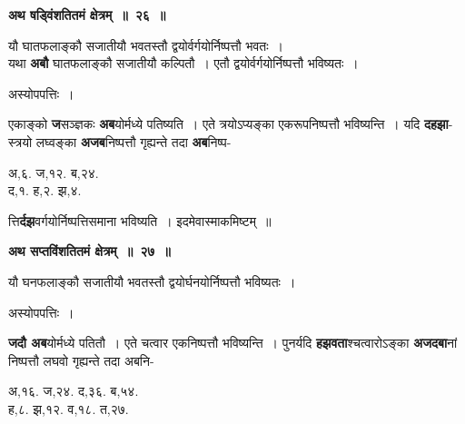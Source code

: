 \documentclass[11pt, openany]{book}
\begin{document}
\newpage
\begin{center}
\textbf{\large अथ षड्विंशतितमं क्षेत्रम्~॥~२६~॥ }
\end{center}

{\ab  यौ घातफलाङ्कौ सजातीयौ भवतस्तौ द्वयोर्वर्गयोर्निष्पत्तौ भवतः~। }\\

 यथा \textbf{अबौ} घातफलाङ्कौ सजातीयौ कल्पितौ~। एतौ द्वयोर्वर्गयोर्निष्पत्तौ भविष्यतः~। 

\begin{center}
अस्योपपत्तिः~।
\end{center}

\begin{flushleft}
\begin{minipage}[t]{0.6\textwidth}
\hspace{4mm} एकाङ्को \textbf{ज}सञ्ज्ञकः \textbf{अब}योर्मध्ये पतिष्यति~। एते त्रयोऽप्यङ्का एकरूपनिष्पत्तौ  भविष्यन्ति~। यदि \textbf{दहझा}-स्त्रयो लघ्वङ्का \textbf{अजब}निष्पत्तौ गृह्यन्ते तदा \textbf{अब}निष्प-
\end{minipage} 
\hfill
\begin{minipage}[t]{0.3\textwidth}
अ,६. ज,१२. ब,२४.\\
 द,१. ह,२. झ,४.
\end{minipage}
\end{flushleft}
\vspace{-3mm}

\noindent त्ति\textbf{र्दझ}वर्गयोर्निष्पत्तिसमाना भविष्यति~। इदमेवास्माकमिष्टम्~॥ 
\vspace{2mm}

\begin{center}
\textbf{\large अथ सप्तविंशतितमं क्षेत्रम्~॥~२७~॥} 
\end{center}

{\ab  यौ घनफलाङ्कौ सजातीयौ भवतस्तौ द्वयोर्घनयोर्निष्पत्तौ भविष्यतः~। }

\begin{center}
अस्योपपत्तिः~।
\end{center}

\begin{flushleft}
\begin{minipage}[t]{0.55\textwidth}
\hspace{4mm} \textbf{जदौ अब}योर्मध्ये पतितौ~। एते चत्वार एकनिष्पत्तौ भविष्यन्ति~।  पुनर्यदि \textbf{हझवता}श्चत्वारोऽङ्का \textbf{अजदबा}नां निष्पत्तौ लघवो गृह्यन्ते तदा अबनि-
\end{minipage} 
\hfill
\begin{minipage}[t]{0.35\textwidth}
अ,१६. ज,२४. द,३६. ब,५४.\\
ह,८. झ,१२. व,१८. त,२७.
\end{minipage}
\end{flushleft}
\vspace{-3mm}
\end{document}
